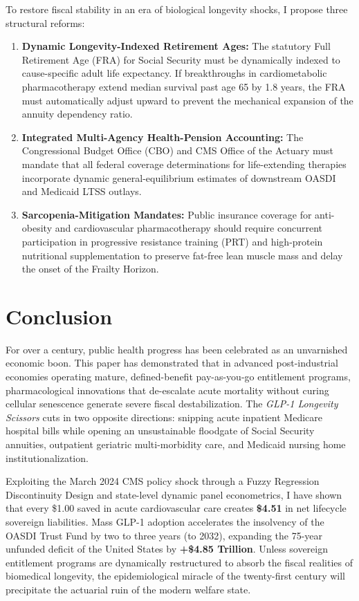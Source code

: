 \documentclass[11pt,a4paper]{article}
\begin{document}
To restore fiscal stability in an era of biological longevity shocks, I propose three structural reforms:
\begin{enumerate}
    \item \textbf{Dynamic Longevity-Indexed Retirement Ages:} The statutory Full Retirement Age (FRA) for Social Security must be dynamically indexed to cause-specific adult life expectancy. If breakthroughs in cardiometabolic pharmacotherapy extend median survival past age 65 by 1.8 years, the FRA must automatically adjust upward to prevent the mechanical expansion of the annuity dependency ratio.
    \item \textbf{Integrated Multi-Agency Health-Pension Accounting:} The Congressional Budget Office (CBO) and CMS Office of the Actuary must mandate that all federal coverage determinations for life-extending therapies incorporate dynamic general-equilibrium estimates of downstream OASDI and Medicaid LTSS outlays.
    \item \textbf{Sarcopenia-Mitigation Mandates:} Public insurance coverage for anti-obesity and cardiovascular pharmacotherapy should require concurrent participation in progressive resistance training (PRT) and high-protein nutritional supplementation to preserve fat-free lean muscle mass and delay the onset of the Frailty Horizon.
\end{enumerate}

\section{Conclusion}
\label{sec:conclusion}
For over a century, public health progress has been celebrated as an unvarnished economic boon. This paper has demonstrated that in advanced post-industrial economies operating mature, defined-benefit pay-as-you-go entitlement programs, pharmacological innovations that de-escalate acute mortality without curing cellular senescence generate severe fiscal destabilization. The \textit{GLP-1 Longevity Scissors} cuts in two opposite directions: snipping acute inpatient Medicare hospital bills while opening an unsustainable floodgate of Social Security annuities, outpatient geriatric multi-morbidity care, and Medicaid nursing home institutionalization.

Exploiting the March 2024 CMS policy shock through a Fuzzy Regression Discontinuity Design and state-level dynamic panel econometrics, I have shown that every \$1.00 saved in acute cardiovascular care creates \textbf{\$4.51} in net lifecycle sovereign liabilities. Mass GLP-1 adoption accelerates the insolvency of the OASDI Trust Fund by two to three years (to 2032), expanding the 75-year unfunded deficit of the United States by \textbf{+\$4.85 Trillion}. Unless sovereign entitlement programs are dynamically restructured to absorb the fiscal realities of biomedical longevity, the epidemiological miracle of the twenty-first century will precipitate the actuarial ruin of the modern welfare state.
\end{document}
